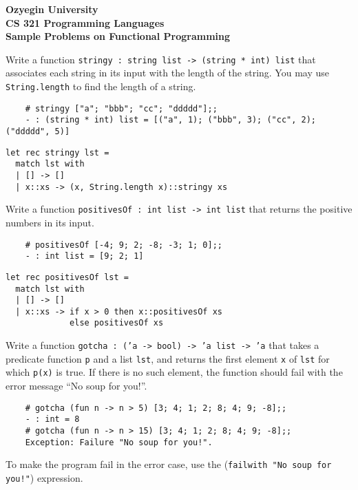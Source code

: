 \documentclass[addpoints]{exam}
\begin{document}
\begin{center}
{\Large \textbf{
    Ozyegin University\\
    CS 321 Programming Languages\\
    Sample Problems on Functional Programming
}}
\end{center}

\begin{questions}
  \question 
  Write a function \texttt{stringy : string list -> (string * int) list}
  that associates each string in its input with the length of the string.
  You may use \texttt{String.length} to find the length of a string.
  \begin{verbatim}
    # stringy ["a"; "bbb"; "cc"; "ddddd"];;                                               
    - : (string * int) list = [("a", 1); ("bbb", 3); ("cc", 2); ("ddddd", 5)]
  \end{verbatim}

  \begin{solutionbox}{3cm}
    \begin{verbatim}
let rec stringy lst =
  match lst with
  | [] -> []
  | x::xs -> (x, String.length x)::stringy xs
    \end{verbatim}
  \end{solutionbox}


  \question 
  Write a function \texttt{positivesOf : int list -> int list}
  that returns the positive numbers in its input.
  \begin{verbatim}
    # positivesOf [-4; 9; 2; -8; -3; 1; 0];;
    - : int list = [9; 2; 1]
  \end{verbatim}
  
  \begin{solutionbox}{3.5cm}
    \begin{verbatim}
let rec positivesOf lst =
  match lst with
  | [] -> []
  | x::xs -> if x > 0 then x::positivesOf xs
             else positivesOf xs
    \end{verbatim}
  \end{solutionbox}

  
  \question 
  Write a function \texttt{gotcha : ('a -> bool) -> 'a list -> 'a} 
  that takes a predicate function \texttt{p} and a list \texttt{lst},
  and returns the first element \texttt{x} of \texttt{lst} for which 
  \texttt{p(x)} is true. If there is no such element,
  the function should fail with the error message 
  ``No soup for you!''.
  \begin{verbatim}
    # gotcha (fun n -> n > 5) [3; 4; 1; 2; 8; 4; 9; -8];;
    - : int = 8
    # gotcha (fun n -> n > 15) [3; 4; 1; 2; 8; 4; 9; -8];;
    Exception: Failure "No soup for you!".
  \end{verbatim}
  To make the program fail in the error case, use the 
  (\texttt{failwith "No soup for you!"}) expression.
  

\end{questions}
\end{document}
